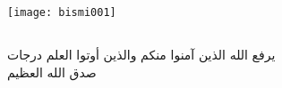 \newpage
\begin{center}
\texttt{[image: bismi001]}
\end{center}

\begin{otherlanguage}{arabic}


\section*{}
\centering
{\large
يرفع الله الذين آمنوا منكم والذين أوتوا العلم درجات
\\



صدق الله العظيم
}



%
%
\end{otherlanguage}